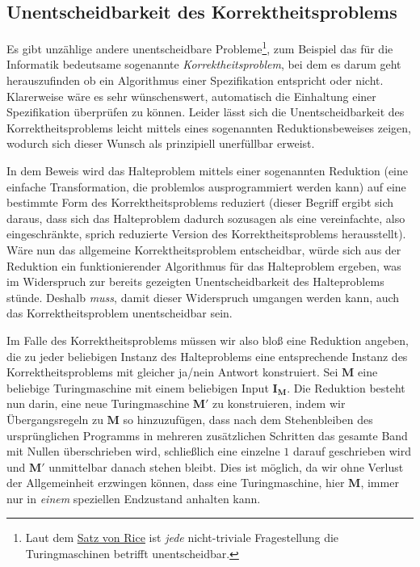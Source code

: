 \subsection{Unentscheidbarkeit des Korrektheitsproblems}
Es gibt unzählige andere unentscheidbare Probleme\footnote{Laut dem \href{http://de.wikipedia.org/wiki/Satz_von_Rice}{Satz von Rice} ist \emph{jede} nicht-triviale Fragestellung die Turingmaschinen betrifft unentscheidbar.}, zum Beispiel das für die Informatik bedeutsame sogenannte \emph{Korrektheitsproblem}, bei dem es darum geht herauszufinden ob ein Algorithmus einer Spezifikation entspricht oder nicht. Klarerweise wäre es sehr wünschenswert, automatisch die Einhaltung einer Spezifikation überprüfen zu können. Leider lässt sich die Unentscheidbarkeit des Korrektheitsproblems leicht mittels eines sogenannten Reduktionsbeweises zeigen, wodurch sich dieser Wunsch als prinzipiell unerfüllbar erweist. 

In dem Beweis wird das Halteproblem mittels einer sogenannten Reduktion (eine einfache Transformation, die problemlos ausprogrammiert werden kann) auf eine bestimmte Form des Korrektheitsproblems reduziert (dieser Begriff ergibt sich daraus, dass sich das Halteproblem dadurch sozusagen als eine vereinfachte, also eingeschränkte, sprich reduzierte Version des Korrektheitsproblems herausstellt). Wäre nun das allgemeine Korrektheitspro\-blem entscheid\-bar, würde sich aus der Reduktion ein funktionierender Algorithmus für das Halteproblem ergeben, was im Widerspruch zur bereits gezeigten Unentscheidbarkeit des Halteproblems stünde. Deshalb \emph{muss}, damit dieser Widerspruch umgangen werden kann, auch das Korrekt\-heitsproblem unentscheidbar sein. 

Im Falle des Korrektheitsproblems müssen wir also bloß eine Reduktion angeben, die zu jeder beliebigen Instanz des Halteproblems eine entsprechende Instanz des Korrektheits\-problems mit gleicher ja/nein Antwort konstruiert. Sei $\mathbf{M}$ eine beliebige Turingmaschine mit einem beliebigen Input $\mathbf{I_M}$. Die Reduktion besteht nun darin, eine neue Turingmaschine $\mathbf{M'}$ zu konstruieren, indem wir Übergangsregeln zu $\mathbf{M}$ so hinzuzufügen, dass nach dem Stehenbleiben des ursprünglichen Programms in mehreren zusätzlichen Schritten das gesamte Band mit Nullen überschrieben wird, schließlich eine einzelne $1$ darauf geschrieben wird und $\mathbf{M'}$ unmittelbar danach stehen bleibt. Dies ist möglich, da wir ohne Verlust der Allgemeinheit erzwingen können, dass eine Turingmaschine, hier $\mathbf{M}$, immer nur in \emph{einem} speziellen Endzustand anhalten kann. 

